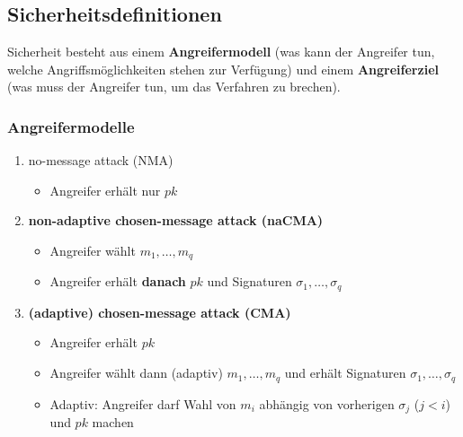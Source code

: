 \documentclass[12pt,A4]{extarticle}
\newcommand{\highlight}[1]{\textcolor{highlightColor}{\textbf{#1}}}
\begin{document}
\subsection{Sicherheitsdefinitionen}\label{sec:signaturenSicherheitsdefinitionen}
Sicherheit besteht aus einem \highlight{Angreifermodell} (was kann der Angreifer tun, welche Angriffsmöglichkeiten stehen zur Verfügung) und einem \highlight{Angreiferziel} (was muss der Angreifer tun, um das Verfahren zu brechen).

\subsubsection{Angreifermodelle}
\begin{enumerate}
  \item{no-message attack (NMA)
              \begin{itemize}
                \item{Angreifer erhält nur $pk$}
              \end{itemize}
        }
  \item{\highlight{non-adaptive chosen-message attack (naCMA)}
              \begin{itemize}
                \item{Angreifer wählt $m_1, \dots, m_q$}
                \item{Angreifer erhält \textbf{danach} $pk$ und Signaturen $\sigma_1, \dots, \sigma_q$}
              \end{itemize}
        }
  \item{\highlight{(adaptive) chosen-message attack (CMA)}
              \begin{itemize}
                \item{Angreifer erhält $pk$}
                \item{Angreifer wählt dann (adaptiv) $m_1, \dots, m_q$ und erhält Signaturen $\sigma_1, \dots, \sigma_q$}
                \item{Adaptiv: Angreifer darf Wahl von $m_i$ abhängig von vorherigen $\sigma_j$ ($j < i$) und $pk$ machen}
              \end{itemize}
        }
\end{enumerate}
\end{document}

